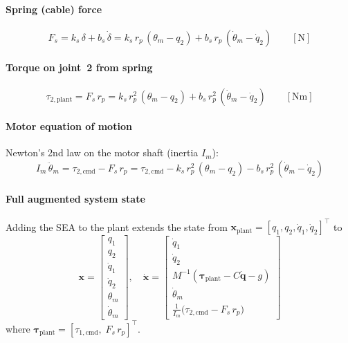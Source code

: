 \documentclass[11pt, a4paper]{article}
\newcommand{\rp}{r_p}
\newcommand{\bqd}{\dot{\bm{q}}}
\begin{document}
\paragraph{Spring (cable) force}
\begin{equation}
  F_s = k_s\,\delta + b_s\,\dot\delta
      = k_s\,\rp\,(\theta_m - q_2) + b_s\,\rp\,(\dot\theta_m - \dot q_2)
      \qquad [\text{N}]
  \label{eq:Fs}
\end{equation}

\paragraph{Torque on joint~2 from spring}
\begin{equation}
  \tau_{2,\text{plant}} = F_s\,\rp
    = k_s\,\rp^2\,(\theta_m - q_2) + b_s\,\rp^2\,(\dot\theta_m - \dot q_2)
  \qquad [\text{Nm}]
  \label{eq:tau2-spring}
\end{equation}

\paragraph{Motor equation of motion}
Newton's 2nd law on the motor shaft (inertia $I_m$):
\begin{equation}
  I_m\,\ddot\theta_m = \tau_{2,\text{cmd}} - F_s\,\rp
    = \tau_{2,\text{cmd}} - k_s\,\rp^2\,(\theta_m - q_2)
      - b_s\,\rp^2\,(\dot\theta_m - \dot q_2)
  \label{eq:motor-eom}
\end{equation}

\paragraph{Full augmented system state}
Adding the SEA to the plant extends the state from
$\bm{x}_\text{plant} = [q_1, q_2, \dot q_1, \dot q_2]^\top$ to
\begin{equation}
  \bm{x} =
  \begin{bmatrix} q_1 \\ q_2 \\ \dot q_1 \\ \dot q_2 \\ \theta_m \\ \dot\theta_m \end{bmatrix},
  \quad
  \dot{\bm{x}} =
  \begin{bmatrix}
    \dot q_1 \\ \dot q_2 \\
    M^{-1}(\bm{\tau}_\text{plant} - C\bqd - g) \\
    \dot\theta_m \\
    \tfrac{1}{I_m}\bigl(\tau_{2,\text{cmd}} - F_s\,\rp\bigr)
  \end{bmatrix}
  \label{eq:augmented-state}
\end{equation}
where $\bm{\tau}_\text{plant} = [\tau_{1,\text{cmd}},\; F_s\,\rp]^\top$.
\end{document}
